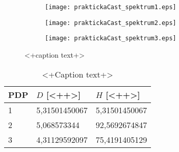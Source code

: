 \begin{figure}[h]
  \centering
  \begin{subfigure}{0.49\textwidth}
	\texttt{[image: praktickaCast\_spektrum1.eps]}
	\caption{}
  \end{subfigure}
  \begin{subfigure}{0.49\textwidth}
	\texttt{[image: praktickaCast\_spektrum2.eps]}
	\caption{}
  \end{subfigure}
  \begin{subfigure}{0.49\textwidth}
	\texttt{[image: praktickaCast\_spektrum3.eps]}
	\caption{}
  \end{subfigure}
  \caption{<+caption text+>}
  \label{fig:praktickaCast_LETspektra}
\end{figure}

\begin{table}[H]
  \centering
  \begin{tabular}{lll}
	\toprule
	PDP&$D$ [<++>]&$H$ [<++>]\\
	\midrule
	1&5,31501450067&5,31501450067\\
	2&5,068573344&92,5692674847\\
	3&4,31129592097&75,4191405129\\
	\bottomrule
  \end{tabular}
  \caption{<+Caption text+>}
  \label{tab:praktickaCast_davkyVysledky}
\end{table}
